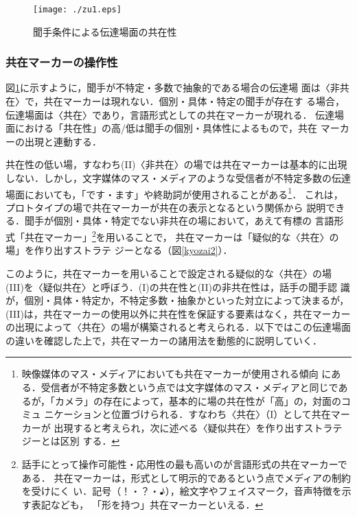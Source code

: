 \documentclass[japanese]{jnlp_1.3c}
\begin{document}
\begin{figure}[htbp]
 \begin{center}
  \texttt{[image: ./zu1.eps]}
  \caption{\label{kyozai}聞手条件による伝達場面の共在性}
 \end{center}
\end{figure}

\subsubsection{共在マーカーの操作性}

図\ref{kyozai}に示すように，聞手が不特定・多数で抽象的である場合の伝達場
面は〈非共在〉で，共在マーカーは現れない．個別・具体・特定の聞手が存在す
る場合，伝達場面は〈共在〉であり，言語形式としての共在マーカーが現れる．
伝達場面における「共在性」の高/低は聞手の個別・具体性によるもので，共在
マーカーの出現と連動する．

共在性の低い場，すなわち(II)〈非共在〉の場では共在マーカーは基本的に出現
しない．しかし，文字媒体のマス・メディアのような受信者が不特定多数の伝達
場面においても，「です・ます」や終助詞が使用されることがある\footnote{
	映像媒体のマス・メディアにおいても共在マーカーが使用される傾向
	にある．受信者が不特定多数という点では文字媒体のマス・メディアと同じであ
	るが，「カメラ」の存在によって，基本的に場の共在性が「高」の，対面のコミュ
	ニケーションと位置づけられる．すなわち〈共在〉（I）として共在マーカーが
	出現すると考えられ，次に述べる〈疑似共在〉を作り出すストラテジーとは区別
	する．}．
これは，プロトタイプの場で共在マーカーが共在の表示となるという関係から
説明できる．聞手が個別・具体・特定でない非共在の場において，あえて有標の
言語形式「共在マーカー」\unskip\footnote{
	話手にとって操作可能性・応用性の最も高いのが言語形式の共在マーカーである．
	共在マーカーは，形式として明示的であるという点でメディアの制約を受けにく
	い．記号（！・？・♪），絵文字やフェイスマーク，音声特徴を示す表記なども，
	「形を持つ」共在マーカーといえる．}を用いることで，
共在マーカーは「疑似的な〈共在〉の場」を作り出すストラテ
ジーとなる（図\ref{kyozai2}）．

このように，共在マーカーを用いることで設定される疑似的な〈共在〉の場
(III)を〈疑似共在〉と呼ぼう．(I)の共在性と(II)の非共在性は，話手の聞手認
識が，個別・具体・特定か，不特定多数・抽象かといった対立によって決まるが，
(III)は，共在マーカーの使用以外に共在性を保証する要素はなく，共在マーカー
の出現によって〈共在〉の場が構築されると考えられる．以下ではこの伝達場面
の違いを確認した上で，共在マーカーの諸用法を動態的に説明していく．
\end{document}
